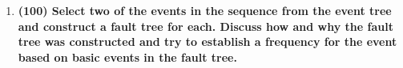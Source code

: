 \documentclass[11pt,a4paper]{article}
\begin{document}
\begin{enumerate}[leftmargin=*,topsep=0pt,font=\bfseries]
        
        \newpage
    \item\textbf{(100) Select two of the events in the sequence from the event tree and construct a fault tree for each. Discuss how and why the fault tree was constructed and try to establish a frequency for the event based on basic events in the fault tree.}
        \vspace{\baselineskip}





















































\end{enumerate}

\newpage 


\setlength{\bibhang}{0pt}

\end{document}
